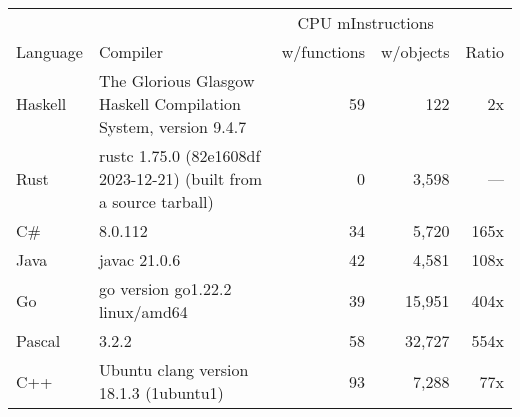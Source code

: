 \documentclass{article}
\begin{document}
      \begin{tabularx}{\linewidth}{lXrrr}
      \toprule
        & & \multicolumn{2}{c}{CPU mInstructions} & \\
        Language & Compiler & w/functions & w/objects & Ratio \\
      \midrule
    Haskell & The Glorious Glasgow Haskell Compilation System, version 9.4.7 & 59 & 122 & 2x \\
Rust & rustc 1.75.0 (82e1608df 2023-12-21) (built from a source tarball) & 0 & 3,598 & --- \\
C\# & 8.0.112 & 34 & 5,720 & 165x \\
Java & javac 21.0.6 & 42 & 4,581 & 108x \\
Go & go version go1.22.2 linux/amd64 & 39 & 15,951 & 404x \\
Pascal & 3.2.2 & 58 & 32,727 & 554x \\
C++ & Ubuntu clang version 18.1.3 (1ubuntu1) & 93 & 7,288 & 77x \\

      \bottomrule
      \end{tabularx}
      
\end{document}

